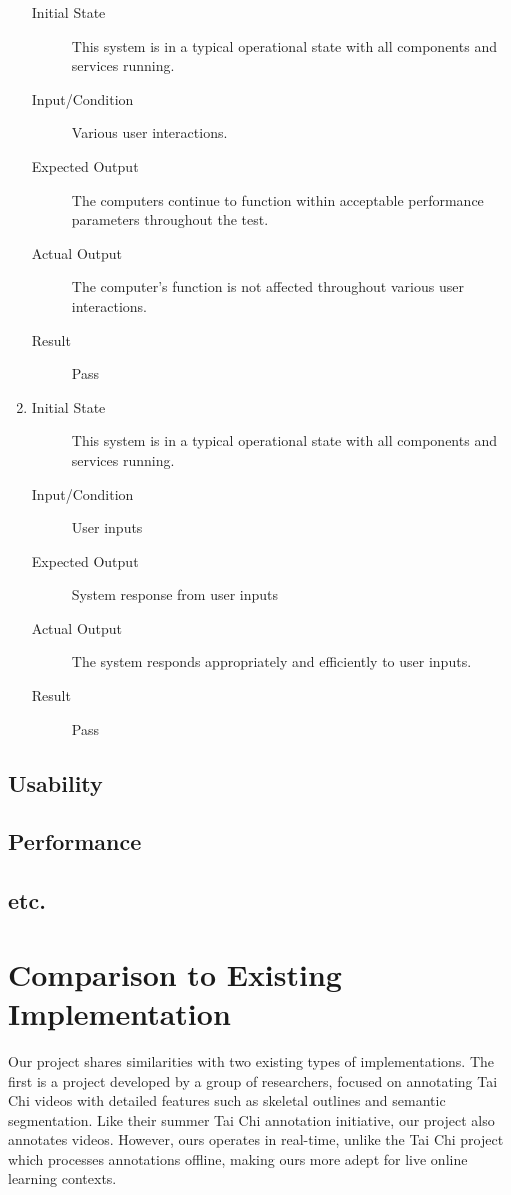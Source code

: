 \documentclass[12pt, titlepage]{article}
\begin{document}
\begin{enumerate}[NFR-T1]
\begin{description}
    \item[Initial State] This system is in a typical operational state with all
      components and services running.
    \item[Input/Condition] Various user interactions.
    \item[Expected Output] The computers continue to function within acceptable
      performance parameters throughout the test.
    \item[Actual Output] The computer's function is not affected throughout 
    various user interactions.
    \item[Result] Pass 
    \end{description}
  \item \label{NFRT30}
    \begin{description}
    \item[Initial State] This system is in a typical operational state with all
      components and services running.
    \item[Input/Condition] User inputs
    \item[Expected Output] System response from user inputs
    \item[Actual Output] The system responds appropriately and efficiently to user inputs.
    \item[Result] Pass 
    \end{description}
  \end{enumerate}

\subsection{Usability}
		
\subsection{Performance}

\subsection{etc.}
	
\section{Comparison to Existing Implementation}	

Our project shares similarities with two existing types of implementations. The first is a project developed by a group of researchers, focused on annotating Tai Chi videos with detailed features such as skeletal outlines and semantic segmentation. Like their summer Tai Chi annotation initiative, our project also annotates videos. However, ours operates in real-time, unlike the Tai Chi project which processes annotations offline, making ours more adept for live online learning contexts.
\end{document}
